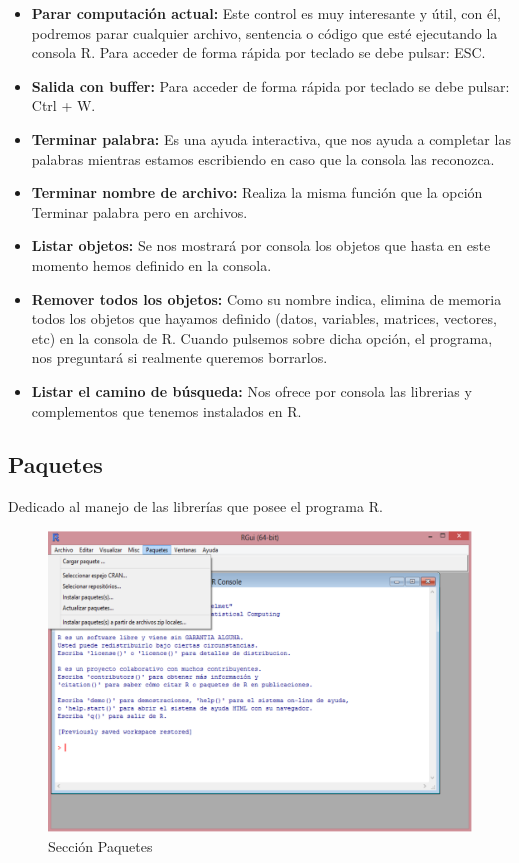 \documentclass[11pt,a4paper,oneside]{book}\usepackage[]{graphicx}\usepackage[]{color}
\begin{document}
\begin{itemize}
\begin{itemize}
      \item {\bf Parar computación actual:} Este control es muy interesante y útil, con él, podremos parar cualquier archivo, sentencia o código que esté ejecutando la consola R. Para acceder de forma rápida por teclado se debe pulsar: ESC.
      \item {\bf Salida con buffer:} Para acceder de forma rápida por teclado se debe pulsar: Ctrl + W.
      \item {\bf Terminar palabra:} Es una ayuda interactiva, que nos ayuda a completar las palabras mientras estamos escribiendo en caso que la consola las reconozca.
      \item {\bf Terminar nombre de archivo:} Realiza la misma función que la opción Terminar palabra pero en archivos.
      \item {\bf Listar objetos:} Se nos mostrará por consola los objetos que hasta en este momento hemos definido en la consola.
      \item {\bf Remover todos los objetos:} Como su nombre indica, elimina de memoria todos los objetos que hayamos definido (datos, variables, matrices, vectores, etc) en la consola de R. Cuando pulsemos sobre dicha opción, el programa, nos preguntará si realmente queremos borrarlos.
      \item {\bf Listar el camino de búsqueda:} Nos ofrece por consola las librerias y complementos que tenemos instalados en R.
\end{itemize}

\subsection{Paquetes} 

Dedicado al manejo de las librerías que posee el programa R.
  \begin{figure}[H]
  \centering
  \includegraphics[scale=.4]{figuras/paquetes.eps}
  \caption{Sección Paquetes}
  \label{paquetes}
  \end{figure}


\end{itemize}
\end{document}
